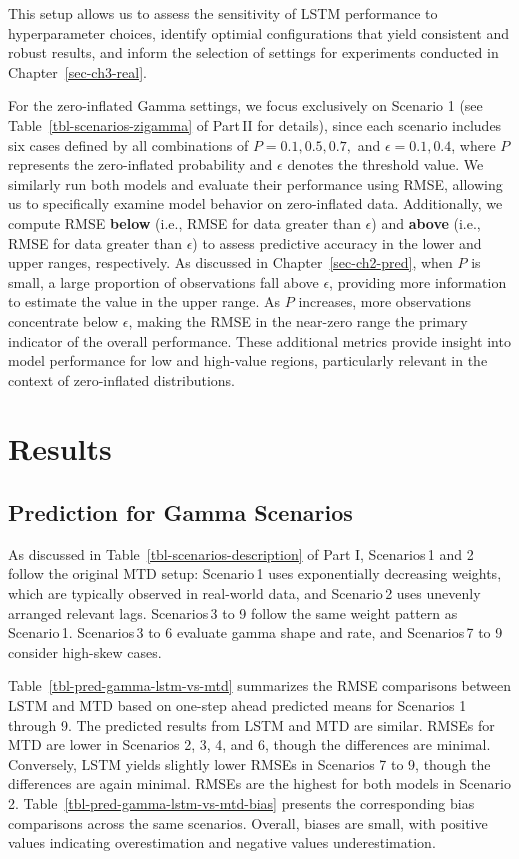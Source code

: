 \documentclass[
  letterpaper,
  double,
  12pt,
  1.0in]{beavtex}
\begin{document}
This setup allows us to assess the sensitivity of LSTM performance to
hyperparameter choices, identify optimial configurations that yield
consistent and robust results, and inform the selection of settings for
experiments conducted in Chapter~\ref{sec-ch3-real}.

For the zero-inflated Gamma settings, we focus exclusively on Scenario 1
(see Table~\ref{tbl-scenarios-zigamma} of Part\,II for details), since
each scenario includes six cases defined by all combinations of
\(P = 0.1, 0.5, 0.7,\) and \(\epsilon = 0.1, 0.4\), where \(P\)
represents the zero-inflated probability and \(\epsilon\) denotes the
threshold value. We similarly run both models and evaluate their
performance using RMSE, allowing us to specifically examine model
behavior on zero-inflated data. Additionally, we compute RMSE
\textbf{below} (i.e., RMSE for data greater than \(\epsilon\)) and
\textbf{above} (i.e., RMSE for data greater than \(\epsilon\)) to assess
predictive accuracy in the lower and upper ranges, respectively. As
discussed in Chapter~\ref{sec-ch2-pred}, when \(P\) is small, a large
proportion of observations fall above \(\epsilon\), providing more
information to estimate the value in the upper range. As \(P\)
increases, more observations concentrate below \(\epsilon\), making the
RMSE in the near-zero range the primary indicator of the overall
performance. These additional metrics provide insight into model
performance for low and high-value regions, particularly relevant in the
context of zero-inflated distributions.

\section{Results}\label{sec-ch3-simu-res}

\subsection{Prediction for Gamma
Scenarios}\label{sec-ch3-simu-res-gamma}

As discussed in Table~\ref{tbl-scenarios-description} of Part I,
Scenarios\,1 and 2 follow the original MTD setup: Scenario\,1 uses
exponentially decreasing weights, which are typically observed in
real-world data, and Scenario\,2 uses unevenly arranged relevant lags.
Scenarios\,3 to 9 follow the same weight pattern as Scenario\,1.
Scenarios\,3 to 6 evaluate gamma shape and rate, and Scenarios\,7 to 9
consider high-skew cases.

Table~\ref{tbl-pred-gamma-lstm-vs-mtd} summarizes the RMSE comparisons
between LSTM and MTD based on one-step ahead predicted means for
Scenarios 1 through 9. The predicted results from LSTM and MTD are
similar. RMSEs for MTD are lower in Scenarios 2, 3, 4, and 6, though the
differences are minimal. Conversely, LSTM yields slightly lower RMSEs in
Scenarios 7 to 9, though the differences are again minimal. RMSEs are
the highest for both models in Scenario 2.
Table~\ref{tbl-pred-gamma-lstm-vs-mtd-bias} presents the corresponding
bias comparisons across the same scenarios. Overall, biases are small,
with positive values indicating overestimation and negative values
underestimation.
\end{document}
